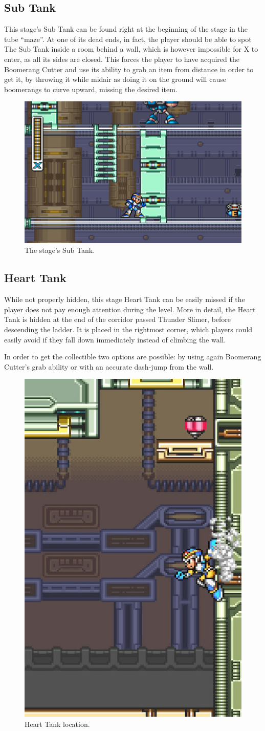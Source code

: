 \subsection{Sub Tank}
This stage's Sub Tank can be found right at the beginning of the stage in the tube ``maze''. At one of its dead ends, in fact, the player should be able to spot The Sub Tank inside a room behind a wall, which is however impossible for X to enter, as all its sides are closed. This forces the player to have acquired the Boomerang Cutter and use its ability to grab an item from distance in order to get it, by throwing it while midair as doing it on the ground will cause boomerangs to curve upward, missing the desired item.
\begin{figure}[htp]
	\centering
	\includegraphics[width=0.45\linewidth]{figures/X1/Spark_mandrill/Mandrill_tank.jpg}
	\caption{The stage's Sub Tank.}
\end{figure}

\subsection{Heart Tank}
While not properly hidden, this stage Heart Tank can be easily missed if the player does not pay enough attention during the level. More in detail, the Heart Tank is hidden at the end of the corridor passed Thunder Slimer, before descending the ladder. It is placed in the rightmost corner, which players could easily avoid if they fall down immediately instead of climbing the wall.

In order to get the collectible two options are possible: by using again Boomerang Cutter's grab ability or with an accurate dash-jump from the wall.
\begin{figure}[htp]
	\centering
	\includegraphics[width=0.3\linewidth]{figures/X1/Spark_mandrill/Mandrill_heart.jpg}
	\caption{Heart Tank location.}
\end{figure}

